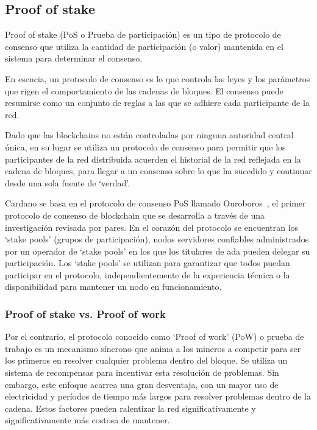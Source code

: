 \documentclass[12pt]{book}
\begin{document}
\subsection{Proof of stake}

Proof of stake (PoS o Prueba de participación) es un tipo de protocolo de consenso que utiliza la cantidad de participación (o valor) mantenida en el sistema para determinar el consenso.

En esencia, un protocolo de consenso es lo que controla las leyes y los parámetros que rigen el comportamiento de las cadenas de bloques. El consenso puede resumirse como un conjunto de reglas a las que se adhiere cada participante de la red.

Dado que las blockchains no están controladas por ninguna autoridad central única, en su lugar se utiliza un protocolo de consenso para permitir que los participantes de la red distribuida acuerden el historial de la red reflejada en la cadena de bloques, para llegar a un consenso sobre lo que ha sucedido y continuar desde una sola fuente de `verdad'.

Cardano se basa en el protocolo de consenso PoS llamado Ouroboros~\cite{pof_ouroboros}, el primer protocolo de consenso de blockchain que se desarrolla a través de una investigación revisada por pares. En el corazón del protocolo se encuentran los `stake pools' (grupos de participación), nodos servidores confiables administrados por un operador de `stake pools' en los que los titulares de ada pueden delegar su participación. Los `stake pools' se utilizan para garantizar que todos puedan participar en el protocolo, independientemente de la experiencia técnica o la disponibilidad para mantener un nodo en funcionamiento.

\subsubsection{Proof of stake vs. Proof of work}

Por el contrario, el protocolo conocido como `Proof of work' (PoW) o prueba de trabajo es un mecanismo síncrono que anima a los mineros a competir para ser los primeros en resolver cualquier problema dentro del bloque. Se utiliza un sistema de recompensas para incentivar esta resolución de problemas. Sin embargo, este enfoque acarrea una gran desventaja, con un mayor uso de electricidad y períodos de tiempo más largos para resolver problemas dentro de la cadena. Estos factores pueden ralentizar la red significativamente y significativamente más costosa de mantener.
\end{document}
